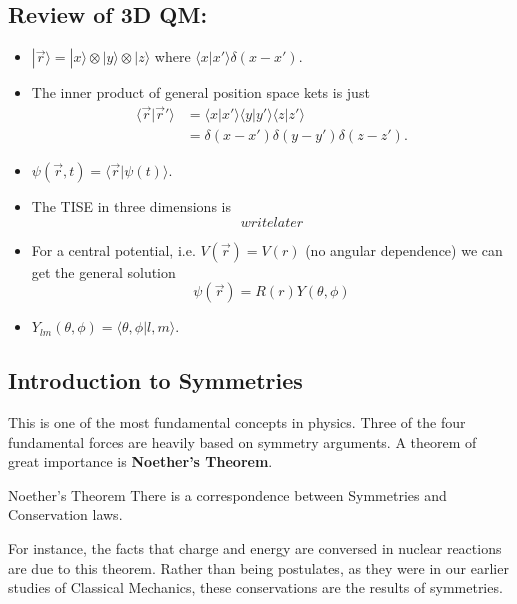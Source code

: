 \documentclass{article}
\newcommand{\ket}[1]{|#1 \rangle}
\newcommand{\inner}[2]{\langle #1 | #2 \rangle}
\begin{document}
\vskip 1cm
\subsection{Review of 3D QM:}

\begin{itemize}
  \item $\ket{\vec{r}} = \ket{x} \otimes \ket{y} \otimes \ket{z} $ where $\inner{x}{x'}  \delta(x - x')$.
  
  \item The inner product of general position space kets is just \begin{align*}
    \inner{\vec{r}}{\vec{r}'} &= \inner{x}{x'}\inner{y}{y'} \inner{z}{z'} \\
    &= \delta(x - x')\delta(y - y')\delta(z - z').
  \end{align*}

  \item $\psi(\vec{r}, t) = \inner{\vec{r}}{\psi(t)}$.
  \item The TISE in three dimensions is 
  \[ write later \]  

  \item For a central potential, i.e. $V(\vec{r}) = V(r)$ (no angular dependence) we can get the general solution
  \[ \psi(\vec{r}) = R(r) Y(\theta, \phi) \]

  \item $Y_{lm}(\theta, \phi) = \inner{\theta, \phi}{l, m}$.
\end{itemize}

\vskip 1cm
\subsection{Introduction to Symmetries}

This is one of the most fundamental concepts in physics. Three of the four fundamental forces are heavily based on symmetry arguments. A theorem of great importance is \textbf{Noether's Theorem}.

\begin{mathdefinitionbox}{Noether's Theorem}
  There is a correspondence between Symmetries and Conservation laws.
\end{mathdefinitionbox}

\vskip 0.5cm
For instance, the facts that charge and energy are conversed in nuclear reactions are due to this theorem. Rather than being postulates, as they were in our earlier studies of Classical Mechanics, these conservations are the results of symmetries.
\end{document}

